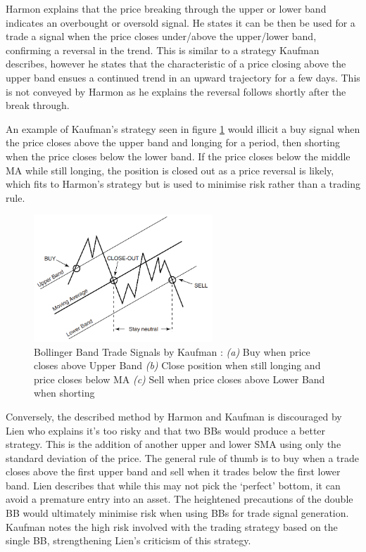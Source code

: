 Harmon \cite{BOOK:Harmon:2014} explains that the price breaking through the upper or lower band indicates an overbought or oversold signal. He states it can be then be used for a trade a signal when the price closes under/above the upper/lower band, confirming a reversal in the trend. This is similar to a strategy Kaufman \cite{BOOK:Kaufman:2013} describes, however he states that the characteristic of a price closing above the upper band ensues a continued trend in an upward trajectory for a few days. This is not conveyed by Harmon \cite{BOOK:Harmon:2014} as he explains the reversal follows shortly after the break through. 

An example of Kaufman's strategy seen in figure \ref{fig:related:BB_trade_strat} would illicit a buy signal when the price closes above the upper band and longing for a period, then shorting when the price closes below the lower band. If the price closes below the middle MA while still longing, the position is closed out as a price reversal is likely, which fits to Harmon's \cite{BOOK:Harmon:2014} strategy but is used to minimise risk rather than a trading rule.

\begin{figure}[htb]
    \centering
	\includegraphics[width=0.6\textwidth]{content/graphics/BB_Trade_Strat}
	\caption{Bollinger Band Trade Signals by Kaufman \cite{BOOK:Kaufman:2013}: 
	\textit{(a)} Buy when price closes above Upper Band
	\textit{(b)} Close position when still longing and price closes below MA
    \textit{(c)} Sell when price closes above Lower Band when shorting}
	\label{fig:related:BB_trade_strat}
\end{figure}

Conversely, the described method by Harmon \cite{BOOK:Harmon:2014} and Kaufman \cite{BOOK:Kaufman:2013} is discouraged by Lien \cite{BOOK:Lien:2016} who explains it's too risky and that two BBs would produce a better strategy. This is the addition of another upper and lower SMA using only the standard deviation of the price. The general rule of thumb is to buy when a trade closes above the first upper band and sell when it trades below the first lower band. Lien describes that while this may not pick the `perfect' bottom, it can avoid a premature entry into an asset. The heightened precautions of the double BB would ultimately minimise risk when using BBs for trade signal generation. Kaufman \cite{BOOK:Kaufman:2013} notes the high risk involved with the trading strategy based on the single BB, strengthening Lien's criticism of this strategy.

